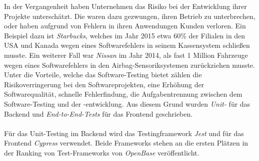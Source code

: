 In der Vergangenheit haben Unternehmen das Risiko bei der Entwicklung ihrer Projekte unterschätzt. Die waren dazu gezwungen, ihren Betrieb zu unterbrechen, oder haben aufgrund von Fehlern in ihren Anwendungen Kunden verloren. Ein Beispiel dazu ist \textit{Starbucks}, welches im Jahr 2015 etwa 60\% der Filialen in den USA und Kanada wegen eines Softwarefehlers in seinem Kassensystem schließen musste{\cite{QS1}}. Ein weiterer Fall war \textit{Nissan} im Jahr 2014, als fast 1 Million Fahrzeuge wegen eines Softwarefehlers in den Airbag-Sensoriksystemen zurückziehen musste{\cite{QS2}}. Unter die Vorteile, welche das Software-Testing bietet zählen die Risikoverringerung bei den Softwareprojekten, eine Erhöhung der Softwarequalität, schnelle Fehlerfindung, die Aufgabentrennung zwischen dem Software-Testing und der -entwicklung.  Aus diesem Grund wurden \textit{Unit-} für das Backend und \textit{End-to-End-Tests} für das Frontend geschrieben. 
\\\\
Für das Unit-Testing im Backend wird das Testingframework \textit{Jest} und für das Frontend \textit{Cypress} verwendet. Beide Frameworks stehen an die ersten Plätzen in der Ranking von Test-Frameworks von \textit{OpenBase} veröffentlicht{\cite{QS3}}.

